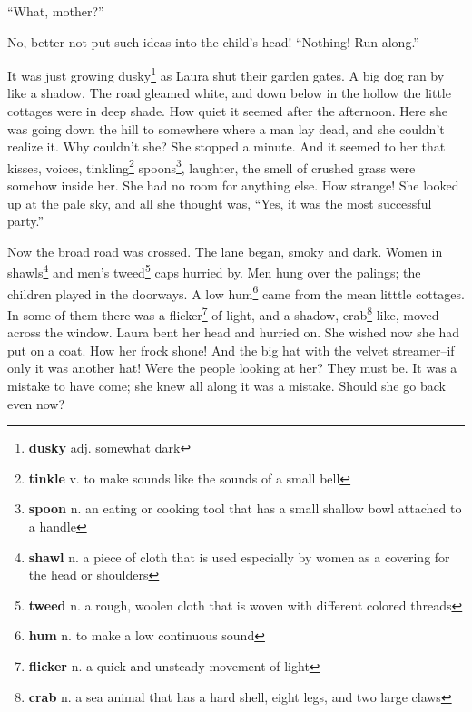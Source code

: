 ``What, mother?''

No, better not put such ideas into the child's head! ``Nothing! Run along.''

It was just growing dusky\footnote{\textbf{dusky} adj. somewhat dark} as Laura shut their garden gates. A big dog ran by like a shadow. The road gleamed white, and down below in the hollow the little cottages were in deep shade. How quiet it seemed after the afternoon. Here she was going down the hill to somewhere where a man lay dead, and she couldn't realize it. Why couldn't she? She stopped a minute. And it seemed to her that kisses, voices, tinkling\footnote{\textbf{tinkle} v. to make sounds like the sounds of a small bell} spoons\footnote{\textbf{spoon} n. an eating or cooking tool that has a small shallow bowl attached to a handle}, laughter, the smell of crushed grass were somehow inside her. She had no room for anything else. How strange! She looked up at the pale sky, and all she thought was, ``Yes, it was the most successful party.''

Now the broad road was crossed. The lane began, smoky and dark. Women in shawls\footnote{\textbf{shawl} n. a piece of cloth that is used especially by women as a covering for the head or shoulders} and men's tweed\footnote{\textbf{tweed} n. a rough, woolen cloth that is woven with different colored threads} caps hurried by. Men hung over the palings; the children played in the doorways. A low hum\footnote{\textbf{hum} n. to make a low continuous sound} came from the mean litttle cottages. In some of them there was a flicker\footnote{\textbf{flicker} n. a quick and unsteady movement of light} of light, and a shadow, crab\footnote{\textbf{crab} n. a sea animal that has a hard shell, eight legs, and two large claws}-like, moved across the window. Laura bent her head and hurried on. She wished now she had put on a coat. How her frock shone! And the big hat with the velvet streamer--if only it was another hat! Were the people looking at her? They must be. It was a mistake to have come; she knew all along it was a mistake. Should she go back even now?
